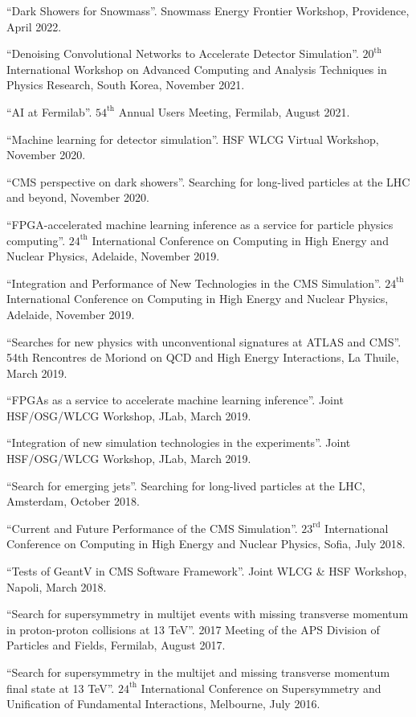 \begin{description}[leftmargin=12pt,font=\normalfont,labelsep=0em]
\item ``Dark Showers for Snowmass''. Snowmass Energy Frontier Workshop, Providence, April 2022.
\item ``Denoising Convolutional Networks to Accelerate Detector Simulation''. $20^{\text{th}}$ International Workshop on Advanced Computing and Analysis Techniques in Physics Research, South Korea, November 2021.
\item ``AI at Fermilab''. $54^{\text{th}}$ Annual Users Meeting, Fermilab, August 2021.
\item ``Machine learning for detector simulation''. HSF WLCG Virtual Workshop, November 2020.
\item ``CMS perspective on dark showers''. Searching for long-lived particles at the LHC and beyond, November 2020.
\item ``FPGA-accelerated machine learning inference as a service for particle physics computing''. $24^{\text{th}}$ International Conference on Computing in High Energy and Nuclear Physics, Adelaide, November 2019.
\item ``Integration and Performance of New Technologies in the CMS Simulation''. $24^{\text{th}}$ International Conference on Computing in High Energy and Nuclear Physics, Adelaide, November 2019.
\item ``Searches for new physics with unconventional signatures at ATLAS and CMS''. 54th Rencontres de Moriond on QCD and High Energy Interactions, La Thuile, March 2019.
\item ``FPGAs as a service to accelerate machine learning inference''. Joint HSF/OSG/WLCG Workshop, JLab, March 2019.
\item ``Integration of new simulation technologies in the experiments''. Joint HSF/OSG/WLCG Workshop, JLab, March 2019.
\item ``Search for emerging jets''. Searching for long-lived particles at the LHC, Amsterdam, October 2018.
\item ``Current and Future Performance of the CMS Simulation''. $23^{\text{rd}}$ International Conference on Computing in High Energy and Nuclear Physics, Sofia, July 2018.
\item ``Tests of GeantV in CMS Software Framework''. Joint WLCG \& HSF Workshop, Napoli, March 2018.
\item ``Search for supersymmetry in multijet events with missing transverse momentum in proton-proton collisions at 13 TeV''. 2017 Meeting of the APS Division of Particles and Fields, Fermilab, August 2017.
\item ``Search for supersymmetry in the multijet and missing transverse momentum final state at 13 TeV''. $24^{\text{th}}$ International Conference on Supersymmetry and Unification of Fundamental Interactions, Melbourne, July 2016.

\end{description}
